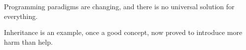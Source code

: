 \begin{frame}
    Programming paradigms are changing, and there is no universal solution for everything.

    \pause

    Inheritance is an example, once a good concept, now proved to introduce more harm than help.
\end{frame}
